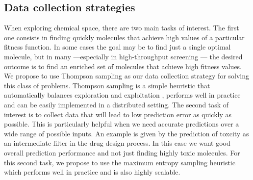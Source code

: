 \subsection{Data collection strategies}

When exploring chemical space, there are two main tasks of interest. The first one consists in finding quickly molecules that achieve high values of a particular fitness function. In some cases the goal may be to find just a single optimal molecule, but in many ---especially in high-throughput screening \cite{Pyzer_Knapp_2015a}--- the desired outcome is to find 
an enriched set of molecules that achieve high fitness values. 
We propose to use Thompson sampling \cite{Thompson_1933} as our data collection strategy for solving this class of problems. Thompson sampling is a simple heuristic that automatically balances exploration and exploitation \cite{Chapelle2011}, performs well in practice and can be easily implemented in a distributed setting.
The second task of interest is to collect data that will lead to low prediction error as quickly as possible. This is particularly helpful when we need accurate predictions over a wide range of possible inputs. An example is given by the prediction of toxcity as an intermediate filter in the drug design process. In this case we want good overall prediction performance and not just finding highly toxic molecules. For this second task, we propose to use the maximum entropy sampling heuristic \cite{MacKay_1992} which performs well in practice and is also highly scalable.